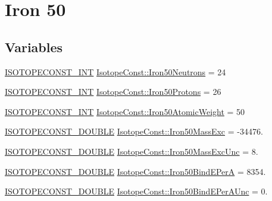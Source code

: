 \hypertarget{group___isotope_const-_iron-_fe50}{}\section{Iron 50}
\label{group___isotope_const-_iron-_fe50}
\subsection*{Variables}
\begin{DoxyCompactItemize}
\item 
\mbox{\hyperlink{group___isotope_const-_macros_ga5f18360b3e99483a35c32d789e62621c}{I\+S\+O\+T\+O\+P\+E\+C\+O\+N\+S\+T\+\_\+\+I\+NT}} \mbox{\hyperlink{group___isotope_const-_iron-_fe50_gae192357b0d379d7c1d366b275074e672}{Isotope\+Const\+::\+Iron50\+Neutrons}} = 24
\item 
\mbox{\hyperlink{group___isotope_const-_macros_ga5f18360b3e99483a35c32d789e62621c}{I\+S\+O\+T\+O\+P\+E\+C\+O\+N\+S\+T\+\_\+\+I\+NT}} \mbox{\hyperlink{group___isotope_const-_iron-_fe50_ga7121ca5cbfccc5fcf3bd324c83e0bc69}{Isotope\+Const\+::\+Iron50\+Protons}} = 26
\item 
\mbox{\hyperlink{group___isotope_const-_macros_ga5f18360b3e99483a35c32d789e62621c}{I\+S\+O\+T\+O\+P\+E\+C\+O\+N\+S\+T\+\_\+\+I\+NT}} \mbox{\hyperlink{group___isotope_const-_iron-_fe50_gaeb366bc7c61ac60fc47a75a2a9d83193}{Isotope\+Const\+::\+Iron50\+Atomic\+Weight}} = 50
\item 
\mbox{\hyperlink{group___isotope_const-_macros_ga8f45a7272ce02c0b4c65c44636ed719a}{I\+S\+O\+T\+O\+P\+E\+C\+O\+N\+S\+T\+\_\+\+D\+O\+U\+B\+LE}} \mbox{\hyperlink{group___isotope_const-_iron-_fe50_ga166c0496d36c23f867f815079e61e4d4}{Isotope\+Const\+::\+Iron50\+Mass\+Exc}} = -\/34476.
\item 
\mbox{\hyperlink{group___isotope_const-_macros_ga8f45a7272ce02c0b4c65c44636ed719a}{I\+S\+O\+T\+O\+P\+E\+C\+O\+N\+S\+T\+\_\+\+D\+O\+U\+B\+LE}} \mbox{\hyperlink{group___isotope_const-_iron-_fe50_gaa83abbb0d8fee96076d5e0cb50f406cc}{Isotope\+Const\+::\+Iron50\+Mass\+Exc\+Unc}} = 8.
\item 
\mbox{\hyperlink{group___isotope_const-_macros_ga8f45a7272ce02c0b4c65c44636ed719a}{I\+S\+O\+T\+O\+P\+E\+C\+O\+N\+S\+T\+\_\+\+D\+O\+U\+B\+LE}} \mbox{\hyperlink{group___isotope_const-_iron-_fe50_ga25e87299a1d6b11489009c1eaedbc073}{Isotope\+Const\+::\+Iron50\+Bind\+E\+PerA}} = 8354.
\item 
\mbox{\hyperlink{group___isotope_const-_macros_ga8f45a7272ce02c0b4c65c44636ed719a}{I\+S\+O\+T\+O\+P\+E\+C\+O\+N\+S\+T\+\_\+\+D\+O\+U\+B\+LE}} \mbox{\hyperlink{group___isotope_const-_iron-_fe50_ga8ddc6c39919f979d7fcee6b48287329a}{Isotope\+Const\+::\+Iron50\+Bind\+E\+Per\+A\+Unc}} = 0.

\end{DoxyCompactItemize}
